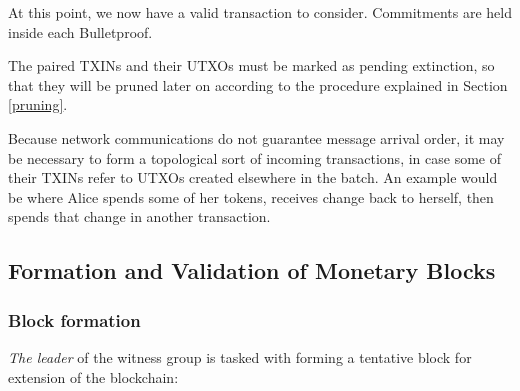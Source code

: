 \documentclass[a4paper, 10pt, conference]{ieeeconf}
\begin{document}
At this point, we now have a valid transaction to consider. Commitments are held inside each Bulletproof.

The paired TXINs and their UTXOs must be marked as pending extinction, so that they will be pruned later on according to the procedure explained in Section \ref{pruning}.

Because network communications do not guarantee message arrival order, it may be necessary to form a topological sort of incoming transactions, in case some of their TXINs refer to UTXOs created elsewhere in the batch. An example would be where Alice spends some of her tokens, receives change back to herself, then spends that change in another transaction.

\subsection{Formation and Validation of Monetary Blocks}\label{Block}

\subsubsection{Block formation} \textit{The leader} of the witness group is tasked with forming a tentative block for extension of the blockchain:
\end{document}
